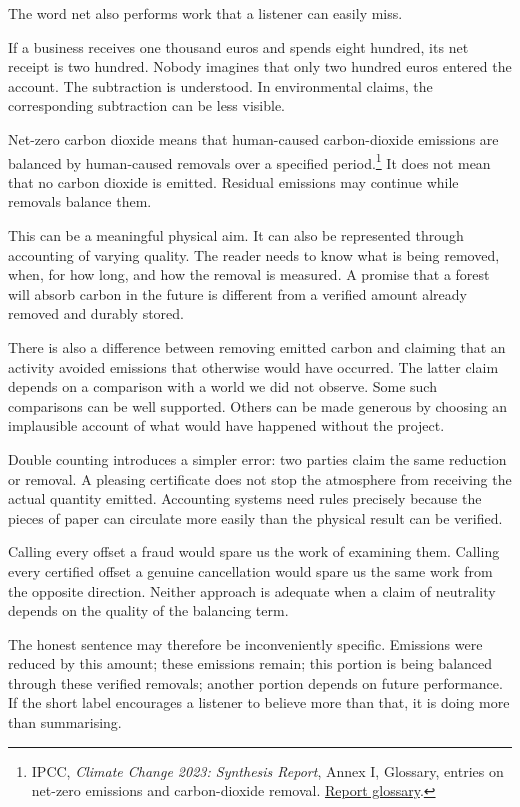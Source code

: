 \documentclass[12pt,a4paper]{book}
\begin{document}
The word net also performs work that a listener can easily miss.

If a business receives one thousand euros and spends eight hundred, its net receipt is two hundred. Nobody imagines that only two hundred euros entered the account. The subtraction is understood. In environmental claims, the corresponding subtraction can be less visible.

Net-zero carbon dioxide means that human-caused carbon-dioxide emissions are balanced by human-caused removals over a specified period.\footnote{IPCC, \emph{Climate Change 2023: Synthesis Report}, Annex I, Glossary, entries on net-zero emissions and carbon-dioxide removal. \href{https://www.ipcc.ch/report/ar6/syr/downloads/report/IPCC_AR6_SYR_Annex-I.pdf}{Report glossary}.} It does not mean that no carbon dioxide is emitted. Residual emissions may continue while removals balance them.

This can be a meaningful physical aim. It can also be represented through accounting of varying quality. The reader needs to know what is being removed, when, for how long, and how the removal is measured. A promise that a forest will absorb carbon in the future is different from a verified amount already removed and durably stored.

There is also a difference between removing emitted carbon and claiming that an activity avoided emissions that otherwise would have occurred. The latter claim depends on a comparison with a world we did not observe. Some such comparisons can be well supported. Others can be made generous by choosing an implausible account of what would have happened without the project.

Double counting introduces a simpler error: two parties claim the same reduction or removal. A pleasing certificate does not stop the atmosphere from receiving the actual quantity emitted. Accounting systems need rules precisely because the pieces of paper can circulate more easily than the physical result can be verified.

Calling every offset a fraud would spare us the work of examining them. Calling every certified offset a genuine cancellation would spare us the same work from the opposite direction. Neither approach is adequate when a claim of neutrality depends on the quality of the balancing term.

The honest sentence may therefore be inconveniently specific. Emissions were reduced by this amount; these emissions remain; this portion is being balanced through these verified removals; another portion depends on future performance. If the short label encourages a listener to believe more than that, it is doing more than summarising.
\end{document}
